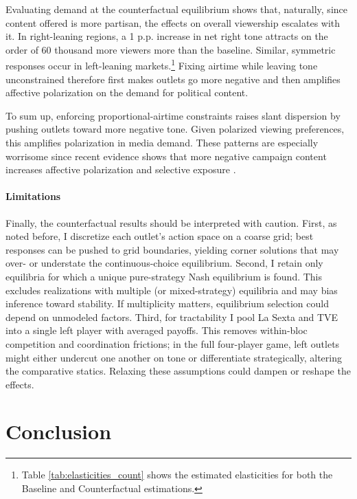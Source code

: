 \documentclass[12pt]{article}
\begin{document}
Evaluating demand at the counterfactual equilibrium shows that, naturally, since content offered is more partisan, the effects on overall viewership escalates with it.  In right-leaning regions, a 1 p.p. increase in net right tone attracts on the order of 60 thousand more viewers more than the baseline. Similar, symmetric responses occur in  left-leaning markets.\footnote{Table \ref{tab:elasticities_count} shows the estimated elasticities for both the Baseline and Counterfactual estimations. } Fixing airtime while leaving tone unconstrained therefore first makes outlets go more negative and then amplifies affective polarization on the demand for political content. 



To sum up, enforcing proportional-airtime constraints raises slant dispersion by pushing outlets toward more negative tone. Given polarized viewing preferences, this amplifies polarization in media demand. These patterns are especially worrisome since recent evidence shows that more negative campaign content increases affective polarization and selective exposure \citep{lau2017effect}.




\paragraph{Limitations} Finally, the counterfactual results should be interpreted with caution. First, as noted before, I discretize each outlet’s action space on a coarse grid; best responses can be pushed to grid boundaries, yielding corner solutions that may over- or understate the continuous-choice equilibrium. Second, I retain only equilibria for which a unique pure-strategy Nash equilibrium is found. This excludes realizations with multiple (or mixed-strategy) equilibria and may bias inference toward stability. If multiplicity matters, equilibrium selection could depend on unmodeled factors. Third, for tractability I pool La Sexta and TVE into a single left player with averaged payoffs. This removes within-bloc competition and coordination frictions; in the full four-player game, left outlets might either undercut one another on tone or differentiate strategically, altering the comparative statics. Relaxing these assumptions could dampen or reshape the effects.



	
	\section{Conclusion}
	\label{sec:conclusion}
	
\end{document}
